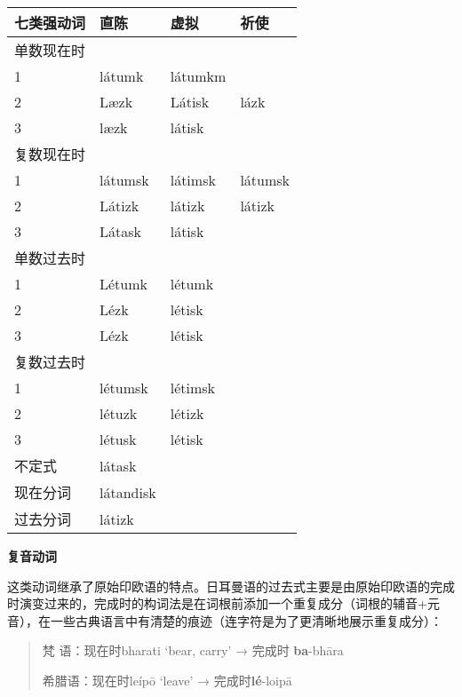 \begin{longtable}{llll}
  \toprule
  七类强动词 & 直陈      & 虚拟    & 祈使    \\
  \midrule
  \endhead
  \bottomrule
  \endfoot
  单数现在时 &           &         &         \\
  1          & látumk    & látumkm &         \\
  2          & Læzk      & Látisk  & lázk    \\
  3          & læzk      & látisk  &         \\
  复数现在时 &           &         &         \\
  1          & látumsk   & látimsk & látumsk \\
  2          & Látizk    & látizk  & látizk  \\
  3          & Látask    & látisk  &         \\
  单数过去时 &           &         &         \\
  1          & Létumk    & létumk  &         \\
  2          & Lézk      & létisk  &         \\
  3          & Lézk      & létisk  &         \\
  复数过去时 &           &         &         \\
  1          & létumsk   & létimsk &         \\
  2          & létuzk    & létizk  &         \\
  3          & létusk    & létisk  &         \\
  不定式     & látask    &         &         \\
  现在分词   & látandisk &         &         \\
  过去分词   & látizk    &         &         \\
\end{longtable}

\textbf{复音动词}

这类动词继承了原始印欧语的特点。日耳曼语的过去式主要是由原始印欧语的完成时演变过来的，完成时的构词法是在词根前添加一个重复成分（词根的辅音+元音），在一些古典语言中有清楚的痕迹（连字符是为了更清晰地展示重复成分）：

\begin{quote}
  梵 语：现在时bharati `bear, carry' → 完成时 \textbf{ba}-bhāra

  希腊语：现在时leípō `leave' → 完成时\textbf{lé}-loipā
\end{quote}

